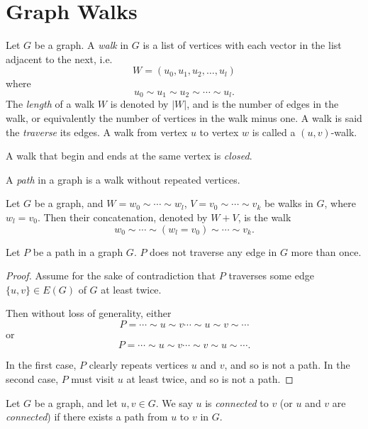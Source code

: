 \section{Graph Walks}

\begin{defn}
    Let $G$ be a graph. A \emph{walk} in $G$ is a list of vertices with each vector in the list adjacent to the next, i.e. \[W = (u_0, u_1, u_2, \ldots, u_l)\] where \[u_0 \sim u_1 \sim u_2 \sim \cdots \sim u_l.\] The \emph{length} of a walk $W$ is denoted by $|W|$, and is the number of edges in the walk, or equivalently the number of vertices in the walk minus one. A walk is said the \emph{traverse} its edges. A walk from vertex $u$ to vertex $w$ is called a $(u, v)$-walk.
\end{defn}

\begin{defn}
    A walk that begin and ends at the same vertex is \emph{closed}.
\end{defn}

\begin{defn}
    A \emph{path} in a graph is a walk without repeated vertices.
\end{defn}

\begin{defn}
    Let $G$ be a graph, and $W = w_0 \sim \cdots \sim w_l$, $V = v_0 \sim \cdots \sim v_k$ be walks in $G$, where $w_l = v_0$. Then their concatenation, denoted by $W + V$, is the walk \[w_0 \sim \cdots \sim (w_l = v_0) \sim \cdots \sim v_k.\]
\end{defn}

\begin{prop}
    Let $P$ be a path in a graph $G$. $P$ does not traverse any edge in $G$ more than once.
\end{prop}

\begin{proof}
    Assume for the sake of contradiction that $P$ traverses some edge $\{u, v\} \in E(G)$ of $G$ at least twice.

    Then without loss of generality, either \[P = \cdots \sim u \sim v \cdots \sim u \sim v \sim \cdots\] or \[P = \cdots \sim u \sim v \cdots \sim v \sim u \sim \cdots.\]

    In the first case, $P$ clearly repeats vertices $u$ and $v$, and so is not a path. In the second case, $P$ must visit $u$ at least twice, and so is not a path.
\end{proof}

\begin{defn}
    Let $G$ be a graph, and let $u, v \in G$. We say $u$ is \emph{connected} to $v$ (or $u$ and $v$ are \emph{connected}) if there exists a path from $u$ to $v$ in $G$.
\end{defn}

